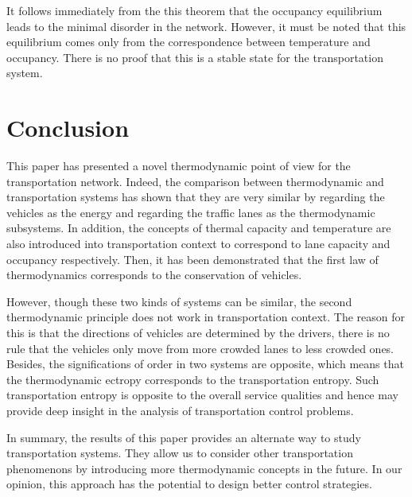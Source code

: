 \documentclass[preprint,authoryear,12pt]{elsarticle}
\begin{document}
It follows immediately from the this theorem that the occupancy
equilibrium leads to the minimal disorder in the network. However, it
must be noted that this equilibrium comes only from the
correspondence between temperature and occupancy. There is no proof
that this is a stable state for the transportation system.

\section{Conclusion}

This paper has presented a novel thermodynamic point of view for the
transportation network. Indeed, the comparison between thermodynamic
and transportation systems has shown that they are very similar by
regarding the vehicles as the energy and regarding the traffic lanes
as the thermodynamic subsystems. In addition, the concepts of thermal
capacity and temperature are also introduced into transportation
context to correspond to lane capacity and occupancy respectively.
Then, it has been demonstrated that the first law of thermodynamics
corresponds to the conservation of vehicles.

However, though these two kinds of systems can be similar, the second
thermodynamic principle does not work in transportation context. The
reason for this is that  the directions of vehicles are determined by
the drivers, there is no rule that the vehicles only move from more
crowded lanes to less crowded ones. Besides, the significations of
order in two systems are opposite, which means that the thermodynamic
ectropy corresponds to the transportation entropy. Such
transportation entropy is opposite to the overall service qualities
and hence may provide deep insight in the analysis of transportation
control problems.


In summary, the results of this paper provides an alternate way to
study transportation systems. They allow us to consider other
transportation phenomenons by introducing more thermodynamic concepts
in the future. In our opinion, this approach has the potential to
design better control strategies.



\end{document}
